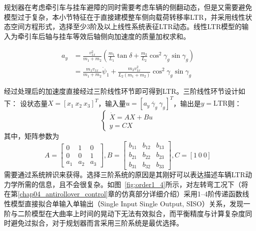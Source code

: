       规划器在考虑牵引车与挂车避障的同时需要考虑车辆的侧翻动态，但是又需要避免模型过于复杂，本小节特征在于直接建模整车侧向载荷转移率LTR，并采用线性状态空间方程形式，选择至少3阶及以上线性系统表征LTR动态。线性LTR模型的输入为牵引车后轴与挂车等效后轴侧向加速度的质量加权求和。

      \begin{equation}
      \begin{aligned}
      a_y &= \frac{v_{1x}^2}{m_1 + m_2} \left( \frac{m_1}{L_1} \tan\delta + \frac{m_2}{L_2} \cos^2 \gamma_{g} \sin\gamma_{g} \right) \\
      &= \frac{m_1 v_{1x}}{m_1 + m_2} \dot{\psi}_1 + \frac{m_2 v_{1x}^2}{L_2(m_1 + m_2)} \cos^2 \gamma_{g} \sin\gamma_{g}
      \end{aligned}
      \label{eq:163}
      \end{equation}


      经过处理后的加速度直接经过三阶线性环节即可得到LTR。三阶线性环节设计如下：
      设状态量$X = [x_1~ x_2~ x_3]^T$，输入量$u = [a_y~ \dot{\gamma_{g}}~ \gamma_{g}]^T$，输出是$y = \text{LTR}$则：
      \begin{equation}
      \begin{cases}
      \dot{X} = AX + Bu \\
      y = CX
      \end{cases}
      \label{eq:164}
      \end{equation}
      \noindent 其中，矩阵参数为
      \begin{equation}
      A = \begin{bmatrix}
      0 & 1 & 0 \\
      0 & 0 & 1 \\
      a_1 & a_2 & a_3
      \end{bmatrix}, B = \begin{bmatrix}
      b_{11} & b_{12} & b_{13} \\
      b_{21} & b_{22} & b_{23} \\
      b_{31} & b_{32} & b_{33}
      \end{bmatrix}, C = [1~ 0~ 0]
      \label{eq:165}
      \end{equation}
      需要通过系统辨识来获得。选择三阶系统的原因是其刚好可以表达描述车辆LTR动力学所需的信息，且不会很复杂。如图~\ref{fig:order1_4}所示，对左转弯工况下（将在第\ref{chap04_antirollover_control}章的仿真部分详细介绍）采用\SIrange{1}{4}{}阶传递函数线性模型直接拟合单输入单输出（Single Input Single Output, SISO）关系，发现一阶与二阶模型在大曲率上时间的晃动下无法有效拟合，而平衡精度与计算复杂度同时避免过拟合，对于规划器而言采用三阶系统是最优选择。
      
